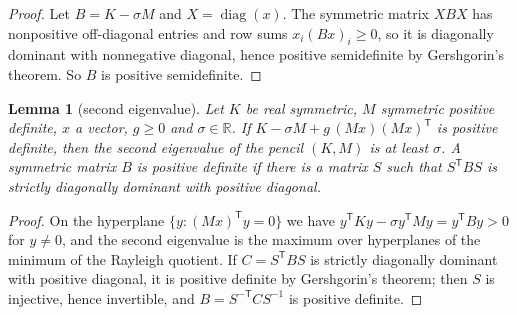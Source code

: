 \documentclass[11pt]{article}
\newtheorem{lemma}[theorem]{Lemma}
\theoremstyle{remark}
\newcommand{\R}{\mathbb{R}}
\begin{document}
\begin{proof}
Let $B=K-\sigma M$ and $X=\operatorname{diag}(x)$. The symmetric matrix $XBX$ has nonpositive
off-diagonal entries and row sums $x_i(Bx)_i\ge0$, so it is diagonally dominant with nonnegative
diagonal, hence positive semidefinite by Gershgorin's theorem. So $B$ is positive semidefinite.
\end{proof}

\begin{lemma}[second eigenvalue]\label{p-lem:inertia}
Let $K$ be real symmetric, $M$ symmetric positive definite, $x$ a vector, $g\ge0$ and
$\sigma\in\R$. If $K-\sigma M+g\,(Mx)(Mx)^{\mathsf T}$ is positive definite, then the second
eigenvalue of the pencil $(K,M)$ is at least $\sigma$. A symmetric matrix $B$ is positive
definite if there is a matrix $S$ such that $S^{\mathsf T}BS$ is strictly diagonally dominant
with positive diagonal.
\end{lemma}

\begin{proof}
On the hyperplane $\{y:(Mx)^{\mathsf T}y=0\}$ we have
$y^{\mathsf T}Ky-\sigma y^{\mathsf T}My=y^{\mathsf T}By>0$ for $y\ne0$, and the second eigenvalue
is the maximum over hyperplanes of the minimum of the Rayleigh quotient. If
$C=S^{\mathsf T}BS$ is strictly diagonally dominant with positive diagonal, it is positive
definite by Gershgorin's theorem; then $S$ is injective, hence invertible, and
$B=S^{-\mathsf T}CS^{-1}$ is positive definite.
\end{proof}
\end{document}

